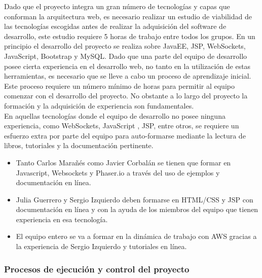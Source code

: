 Dado que el proyecto integra un gran número de tecnologías y capas que conforman la arquitectura web, es necesario realizar un estudio de viabilidad de las tecnologías escogidas antes de realizar la adquisición del software de desarrollo, este estudio requiere  5 horas de trabajo entre todos los grupos.  En un principio el desarrollo del proyecto se realiza sobre JavaEE, JSP, WebSockets, JavaScript, Bootstrap y MySQL. Dado que una parte del equipo de desarrollo posee cierta experiencia en el desarrollo web, no tanto en la utilización de estas herramientas, es necesario que se lleve a cabo un proceso de aprendizaje inicial. Este proceso requiere un número mínimo de horas para permitir al equipo comenzar con el desarrollo del proyecto. No obstante a lo largo del proyecto la formación y la adquisición de experiencia son fundamentales.\\
En aquellas tecnologías donde el equipo de desarrollo no posee ninguna experiencia, como WebSockets, JavaScript , JSP,  entre otros, se requiere un esfuerzo extra por parte del equipo para auto-formarse mediante la lectura de libros, tutoriales y la documentación pertinente.
\begin{itemize}
	\item Tanto Carlos Marañés como Javier Corbalán se tienen que formar en Javascript, Websockets y Phaser.io a través del uso de ejemplos y documentación en línea.
	\item Julia Guerrero y Sergio Izquierdo deben formarse en HTML/CSS y JSP con documentación en línea y  con la ayuda de los miembros del equipo que tienen experiencia en esa tecnología.
    \item El equipo entero se va a formar en la dinámica de trabajo con AWS gracias a la experiencia de Sergio Izquierdo y tutoriales en línea.
\end{itemize}

\subsubsection{Procesos de ejecución y control del proyecto}


